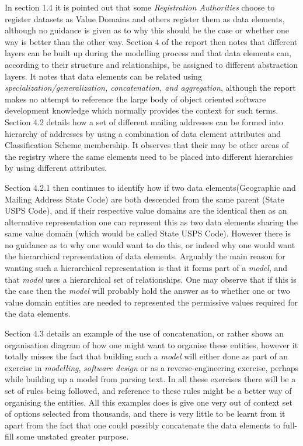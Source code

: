 \documentclass{article}
\begin{document}
In section 1.4 it is pointed out that some \emph{Registration Authorities} choose to register datasets as Value Domains and others register them as data elements, although no guidance is given as to why this should be the case or whether one way is better than the other way. Section 4 of the report then notes that different layers can be built up during the modelling process and that data elements can, according to their structure and relationships, be assigned to different abstraction layers. It notes that data elements can be related using \emph{specialization/generalization, concatenation, and aggregation}, although the report makes no attempt to reference the large body of object oriented software development knowledge which normally provides the context for such terms. Section 4.2 details how a set of different mailing addresses can be formed into hierarchy of addresses by using a combination of data element attributes and Classification Scheme membership. It observes that their may be other areas of the registry where the same elements need to be placed into different hierarchies by using different attributes. 

Section 4.2.1 then continues to identify how if two data elements(Geographic and Mailing Address State Code) are both  descended from the same parent (State USPS Code), and if their respective value domains are the identical then as an alternative representation one can represent this as two data elements sharing the same value domain (which would be called State USPS Code). However there is no guidance as to why one would want to do this, or indeed why one would want the hierarchical representation of data elements. Arguably the main reason for wanting such a hierarchical representation is that it forms part of a \emph{model}, and that \emph{model} uses a hierarchical set of relationships. One may observe that if this is the case then the \emph{model} will probably hold the answer as to whether one or two value domain entities are needed to represented the permissive values required for the data elements.

Section 4.3 details an example of the use of concatenation, or rather shows an organisation diagram of how one might want to organise these entities, however it totally misses the fact that building such a \emph{model} will either done as part of an exercise in \emph{modelling}, \emph{software design} or as a reverse-engineering exercise, perhaps while building up a model from parsing text. In all these exercises there will be a set of rules being followed, and reference to these rules might be a better way of organising the entities.  All this examples does is give one very out of context set of options selected from thousands, and there is very little to be learnt from it apart from the fact that one could possibly concatenate the data elements to full-fill some unstated greater purpose.
\end{document}
